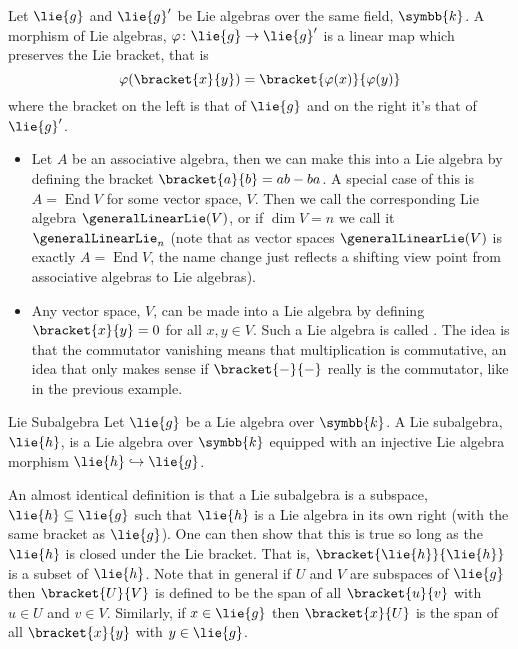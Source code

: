 \documentclass[fleqn]{NotesClass}
\renewcommand{\field}{\symbb{k}}
\DeclareMathOperator{\End}{End}
\begin{document}
    \begin{dfn}{}{}
        Let \(\lie{g}\) and \(\lie{g}'\) be Lie algebras over the same field, \(\field\).
        A morphism of Lie algebras, \(\varphi \colon \lie{g} \to \lie{g}'\) is a linear map which preserves the Lie bracket, that is
        \begin{equation}
            \varphi(\bracket{x}{y}) = \bracket{\varphi(x)}{\varphi(y)}
        \end{equation}
        where the bracket on the left is that of \(\lie{g}\) and on the right it's that of \(\lie{g}'\).
    \end{dfn}
    
    \begin{exm}{}{}
        \begin{itemize}
            \item Let \(A\) be an associative algebra, then we can make this into a Lie algebra by defining the bracket \(\bracket{a}{b} = ab - ba\).
            A special case of this is \(A = \End V\) for some vector space, \(V\).
            Then we call the corresponding Lie algebra \(\generalLinearLie(V)\), or if \(\dim V = n\) we call it \(\generalLinearLie_n\) (note that as vector spaces \(\generalLinearLie(V)\) is exactly \(A = \End V\), the name change just reflects a shifting view point from associative algebras to Lie algebras).
            \item Any vector space, \(V\), can be made into a Lie algebra by defining \(\bracket{x}{y} = 0\) for all \(x, y \in V\).
            Such a Lie algebra is called .
            The idea is that the commutator vanishing means that multiplication is commutative, an idea that only makes sense if \(\bracket{-}{-}\) really is the commutator, like in the previous example.
        \end{itemize}
    \end{exm}
     
    \begin{dfn}{Lie Subalgebra}{}
        Let \(\lie{g}\) be a Lie algebra over \(\field\).
        A Lie subalgebra, \(\lie{h}\), is a Lie algebra over \(\field\) equipped with an injective Lie algebra morphism \(\lie{h} \hookrightarrow \lie{g}\).
    \end{dfn}
    
    An almost identical definition is that a Lie subalgebra is a subspace, \(\lie{h} \subseteq \lie{g}\) such that \(\lie{h}\) is a Lie algebra in its own right (with the same bracket as \(\lie{g}\)).
    One can then show that this is true so long as the \(\lie{h}\) is closed under the Lie bracket.
    That is, \(\bracket{\lie{h}}{\lie{h}}\) is a subset of \(\lie{h}\).
    Note that in general if \(U\) and \(V\) are subspaces of \(\lie{g}\) then \(\bracket{U}{V}\) is defined to be the span of all \(\bracket{u}{v}\) with \(u \in U\) and \(v \in V\).
    Similarly, if \(x \in \lie{g}\) then \(\bracket{x}{U}\) is the span of all \(\bracket{x}{y}\) with \(y \in \lie{g}\).
    
\end{document}
